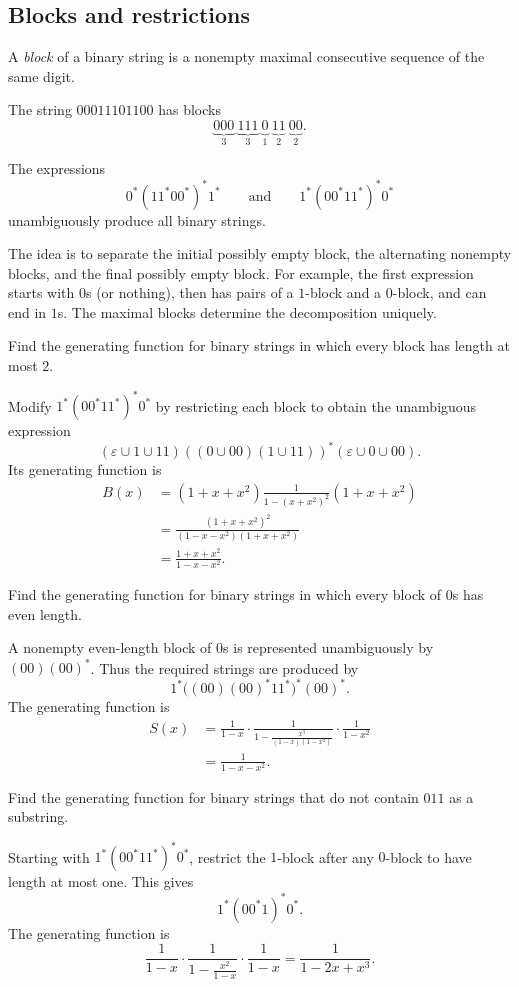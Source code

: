 \subsection{Blocks and restrictions}
\begin{definition}
A \textit{block} of a binary string is a nonempty maximal consecutive sequence of the same digit.
\end{definition}
\begin{example}
The string $00011101100$ has blocks
\[
\underbrace{000}_{3}\ \underbrace{111}_{3}\ \underbrace{0}_{1}\
\underbrace{11}_{2}\ \underbrace{00}_{2}.
\]
\end{example}
\begin{theorem}
The expressions
\[
0^*(11^*00^*)^*1^*
\qquad\text{and}\qquad
1^*(00^*11^*)^*0^*
\]
unambiguously produce all binary strings.
\end{theorem}
The idea is to separate the initial possibly empty block, the alternating nonempty blocks, and the final possibly empty block. For example, the first expression starts with $0$s (or nothing), then has pairs of a $1$-block and a $0$-block, and can end in $1$s. The maximal blocks determine the decomposition uniquely.
\begin{example}
Find the generating function for binary strings in which every block has length at most $2$.\par\medskip
Modify $1^*(00^*11^*)^*0^*$ by restricting each block to obtain the unambiguous expression
\[
(\varepsilon\cup1\cup11)((0\cup00)(1\cup11))^*(\varepsilon\cup0\cup00).
\]
Its generating function is
\begin{align*}
B(x)&=(1+x+x^2)\frac1{1-(x+x^2)^2}(1+x+x^2)\\
&=\frac{(1+x+x^2)^2}{(1-x-x^2)(1+x+x^2)}\\
&=\frac{1+x+x^2}{1-x-x^2}.
\end{align*}
\end{example}
\begin{example}
Find the generating function for binary strings in which every block of $0$s has even length.\par\medskip
A nonempty even-length block of $0$s is represented unambiguously by $(00)(00)^*$. Thus the required strings are produced by
\[
1^*\bigl((00)(00)^*11^*\bigr)^*(00)^*.
\]
The generating function is
\begin{align*}
S(x)&=\frac1{1-x}\cdot
\frac1{1-\frac{x^3}{(1-x)(1-x^2)}}\cdot\frac1{1-x^2}\\
&=\frac1{1-x-x^2}.
\end{align*}
\end{example}
\begin{example}
Find the generating function for binary strings that do not contain $011$ as a substring.\par\medskip
Starting with $1^*(00^*11^*)^*0^*$, restrict the $1$-block after any $0$-block to have length at most one. This gives
\[
1^*(00^*1)^*0^*.
\]
The generating function is
\[
\frac1{1-x}\cdot\frac1{1-\frac{x^2}{1-x}}\cdot\frac1{1-x}
=\frac1{1-2x+x^3}.
\]
\end{example}
